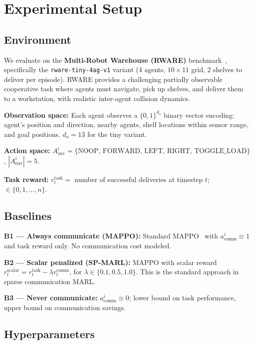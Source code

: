 \documentclass[runningheads]{llncs}
\begin{document}
\section{Experimental Setup}
\label{sec:experiments}

\subsection{Environment}

We evaluate on the \textbf{Multi-Robot Warehouse (RWARE)}
benchmark~\cite{christianos2020shared}, specifically the
\texttt{rware-tiny-4ag-v1} variant (4 agents, $10 \times 11$ grid,
2 shelves to deliver per episode).
RWARE provides a challenging partially observable cooperative task
where agents must navigate, pick up shelves, and deliver them to a
workstation, with realistic inter-agent collision dynamics.

\textbf{Observation space:} Each agent observes a $\{0,1\}^{d_o}$
binary vector encoding: agent's position and direction, nearby agents,
shelf locations within sensor range, and goal positions.
$d_o = 13$ for the tiny variant.

\textbf{Action space:} $A^i_\text{env} = \{\text{NOOP, FORWARD, LEFT, RIGHT, TOGGLE\_LOAD}\}$,
$|A^i_\text{env}| = 5$.

\textbf{Task reward:} $r^\text{task}_t = $ number of successful deliveries
at timestep $t$; $\in \{0, 1, \ldots, n\}$.

\subsection{Baselines}

\textbf{B1 — Always communicate (MAPPO):} Standard MAPPO~\cite{yu2021surprising}
with $a^i_\text{comm} \equiv 1$ and task reward only.
No communication cost modeled.

\textbf{B2 — Scalar penalized (SP-MARL):} MAPPO with scalar reward
$r^\text{scalar}_t = r^\text{task}_t - \lambda r^\text{comm}_t$,
for $\lambda \in \{0.1, 0.5, 1.0\}$.
This is the standard approach in sparse communication MARL.

\textbf{B3 — Never communicate:} $a^i_\text{comm} \equiv 0$;
lower bound on task performance, upper bound on communication savings.

\subsection{Hyperparameters}
\end{document}
